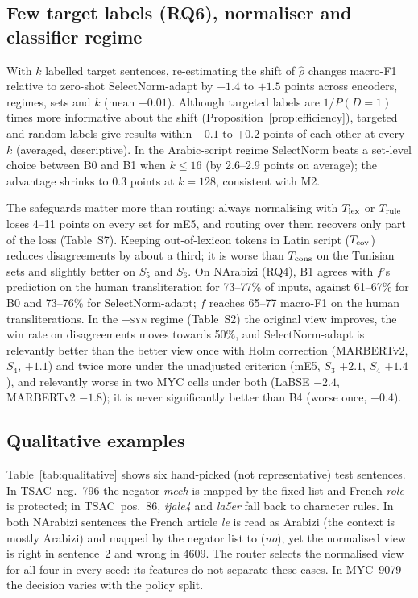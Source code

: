 \subsection{Few target labels (RQ6), normaliser and classifier regime}
\label{sec:fewlabel}
With $k$ labelled target sentences, re-estimating the shift of $\hat\rho$ changes macro-F1 relative to zero-shot SelectNorm-adapt by $-1.4$ to $+1.5$ points across encoders, regimes, sets and $k$ (mean $-0.01$). Although targeted labels are $1/P(D{=}1)$ times more informative about the shift (Proposition~\ref{prop:efficiency}), targeted and random labels give results within $-0.1$ to $+0.2$ points of each other at every $k$ (averaged, descriptive). In the Arabic-script regime SelectNorm beats a set-level choice between B0 and B1 when $k\le16$ (by 2.6--2.9 points on average); the advantage shrinks to 0.3 points at $k=128$, consistent with M2.

\label{sec:normaliser}
The safeguards matter more than routing: always normalising with $T_{\rm lex}$ or $T_{\rm rule}$ loses 4--11 points on every set for mE5, and routing over them recovers only part of the loss (Table~S7). Keeping out-of-lexicon tokens in Latin script ($T_{\rm cov}$) reduces disagreements by about a third; it is worse than $T_{\rm cons}$ on the Tunisian sets and slightly better on $S_5$ and $S_6$. On NArabizi (RQ4), B1 agrees with $f$'s prediction on the human transliteration for 73--77\% of inputs, against 61--67\% for B0 and 73--76\% for SelectNorm-adapt; $f$ reaches 65--77 macro-F1 on the human transliterations. In the \textsc{+syn} regime (Table~S2) the original view improves, the win rate on disagreements moves towards 50\%, and SelectNorm-adapt is relevantly better than the better view once with Holm correction (MARBERTv2, $S_4$, $+1.1$) and twice more under the unadjusted criterion (mE5, $S_3$ $+2.1$, $S_4$ $+1.4$), and relevantly worse in two MYC cells under both (LaBSE $-2.4$, MARBERTv2 $-1.8$); it is never significantly better than B4 (worse once, $-0.4$).

\subsection{Qualitative examples}
\label{sec:qualitative}

Table~\ref{tab:qualitative} shows six hand-picked (not representative) test sentences. In TSAC~neg.~796 the negator \textit{mech} is mapped by the fixed list and French \textit{role} is protected; in TSAC~pos.~86, \textit{ijale4} and \textit{la5er} fall back to character rules. In both NArabizi sentences the French article \textit{le} is read as Arabizi (the context is mostly Arabizi) and mapped by the negator list to  (\textit{no}), yet the normalised view is right in sentence~2 and wrong in 4609. The router selects the normalised view for all four in every seed: its features do not separate these cases. In MYC~9079 the decision varies with the policy split.

